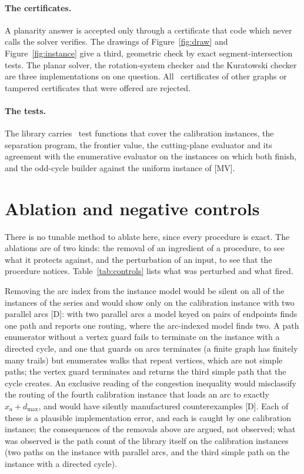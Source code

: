 \documentclass[11pt]{article}
\theoremstyle{remark}
\newcommand{\dmax}{d_{\max}}
\begin{document}
\paragraph{The certificates.} A planarity answer is accepted only through a certificate that code which never calls the solver verifies. The drawings of Figure~\ref{fig:draw} and Figure~\ref{fig:instance} give a third, geometric check by exact segment-intersection tests. The planar solver, the rotation-system checker and the Kuratowski checker are three implementations on one question. All \nctrlc\ certificates of other graphs or tampered certificates that were offered are rejected.

\paragraph{The tests.} The library carries \ntests\ test functions that cover the calibration instances, the separation program, the frontier value, the cutting-plane evaluator and its agreement with the enumerative evaluator on the instances on which both finish, and the odd-cycle builder against the uniform instance of \cite{Afr26} [MV].

\section{Ablation and negative controls}
\label{sec:ablation}

There is no tunable method to ablate here, since every procedure is exact. The ablations are of two kinds: the removal of an ingredient of a procedure, to see what it protects against, and the perturbation of an input, to see that the procedure notices. Table~\ref{tab:controls} lists what was perturbed and what fired.



Removing the arc index from the instance model would be silent on all of the instances of the series and would show only on the calibration instance with two parallel arcs [D]: with two parallel arcs a model keyed on pairs of endpoints finds one path and reports one routing, where the arc-indexed model finds two. A path enumerator without a vertex guard fails to terminate on the instance with a directed cycle, and one that guards on arcs terminates (a finite graph has finitely many trails) but enumerates walks that repeat vertices, which are not simple paths; the vertex guard terminates and returns the third simple path
that the cycle creates. An exclusive reading of the congestion inequality would misclassify the routing of the fourth calibration instance that loads an arc to exactly $x_a+\dmax$, and would have silently manufactured counterexamples [D]. Each of these is a plausible implementation error, and each is caught by one calibration instance; the consequences of the removals above are argued, not observed; what was observed is the path count of the library itself on the calibration instances (two paths on the instance with parallel arcs, and the third simple path on the instance with a directed cycle).
\end{document}
